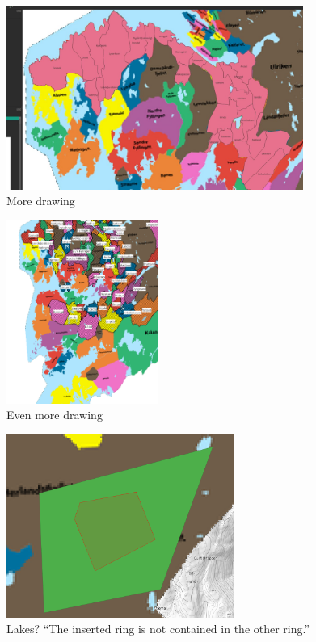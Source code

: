\begin{frame}
    \begin{figure}
        \centering
        \includegraphics[height = 6cm]{images/qgis3.jpg}%
        \caption{More drawing}
    \end{figure}
\end{frame}

\begin{frame}
    \begin{figure}
        \centering
        \includegraphics[height = 6cm]{images/qgis4.png}%
        \caption{Even more drawing}
    \end{figure}
\end{frame}


\begin{frame}
    \begin{figure}
        \centering
        \includegraphics[height = 6cm]{images/qgis_shapeInShape.png}%
        \caption{Lakes? \enquote{The inserted ring is not contained in the other ring.}}
    \end{figure}
\end{frame}

